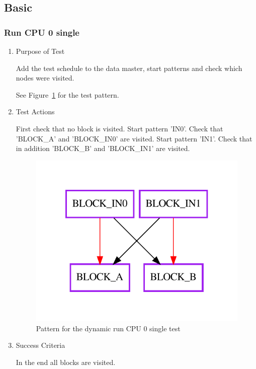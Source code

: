 \documentclass[12pt,a4paper]{report}
\begin{document}
\subsection{Basic}
\subsubsection{Run CPU 0 single}
\begin{enumerate}
	\item Purpose of Test

    Add the test schedule to the data master, start patterns and check which nodes were visited.

	See Figure~\ref{fig:Pattern_for_the_dynamic_run_CPU_0_single_test} for the test pattern.
	\item Test Actions
    
    First check that no block is visited. Start pattern 'IN0'. Check that 'BLOCK\_A' and 'BLOCK\_IN0' are visited. 
    Start pattern 'IN1'. Check that in addition 'BLOCK\_B' and 'BLOCK\_IN1' are visited.
    \begin{figure}
        \centering 
        \includegraphics{TestPattern/dynamic_basic_run_cpu0_single.pdf}
        \caption{Pattern for the dynamic run CPU 0 single test}
        \label{fig:Pattern_for_the_dynamic_run_CPU_0_single_test}
    \end{figure}
	\item Success Criteria

	In the end all blocks are visited.
\end{enumerate}
\end{document}
